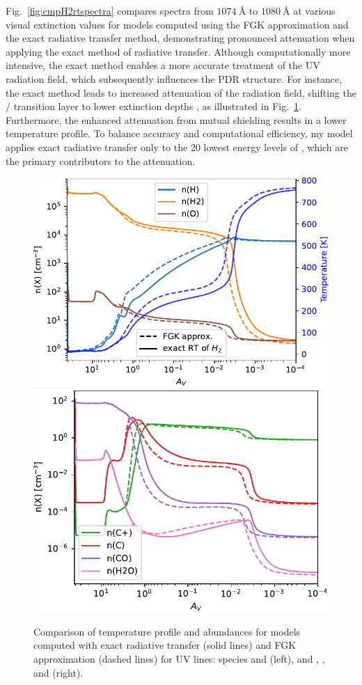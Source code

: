 \documentclass[12pt,a4paper]{article}
\newcommand{\qt}[1]{}
\begin{document}
Fig.~\ref{fig:cmpH2rtspectra} compares spectra from $1074~\text{\AA}$ to $1080~\text{\AA}$ at various visual extinction values for models computed using the FGK approximation and the exact radiative transfer method, demonstrating pronounced attenuation when applying the exact method of  radiative transfer. Although computationally more intensive, the exact method enables a more accurate treatment of the UV radiation field, which subsequently influences the PDR structure. For instance, the exact method leads to increased attenuation of the radiation field, shifting the / transition layer to lower extinction depths \parencite{Goicoechea2007}, as illustrated in Fig.~\ref{fig:cmpH2rt}. Furthermore, the enhanced attenuation from mutual shielding results in a lower temperature profile. To balance accuracy and computational efficiency, my model applies exact radiative transfer only to the 20 lowest energy levels of , which are the primary contributors to the attenuation. \qt{how to explain the second bump occuring in the both cases?}

\begin{figure}[ht]
    \centering
    \includegraphics[width=.51\textwidth,keepaspectratio]{cmpH2rt_H_O.pdf}
    \includegraphics[width=.48\textwidth,keepaspectratio]{cmpH2rt_CO_H2O.pdf}
    \caption{Comparison of temperature profile and abundances for models computed with exact radiative transfer (solid lines) and FGK approximation (dashed lines) for  UV lines:  species and  (left), and , , and  (right).} \label{fig:cmpH2rt}
\end{figure}
\end{document}
